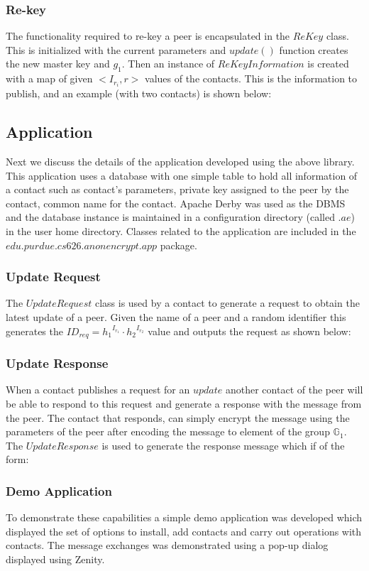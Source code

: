 \subsubsection{Re-key}
The functionality required to re-key a peer is encapsulated in the $ReKey$ class. This is initialized with the current parameters and $update()$ function creates the new master key and $g_1$. Then an instance of $ReKeyInformation$ is created with a map of given $<I_{r_i}, r>$ values of the contacts. This is the information to publish, and an example (with two contacts) is shown below:



\subsection{Application}

Next we discuss the details of the application developed using the above library. This application uses a database with one simple table to hold all information of a contact such as contact's parameters, private key assigned to the peer by the contact, common name for the contact. Apache Derby \cite{derby} was used as the DBMS and the database instance is maintained in a configuration directory (called $.ae$) in the user home directory. Classes related to the application are included in the $edu.purdue.cs626.anonencrypt.app$ package.\\

\subsubsection{Update Request}
The $UpdateRequest$ class is used by a contact to generate a request to obtain the latest update of a peer. Given the name of a peer and a random identifier this generates the $ID_{req} = {h_1}^{I_{r_1}} \cdot {h_2}^{I_{r_2}}$ value and outputs the request as shown below:



\subsubsection{Update Response}
When a contact publishes a request for an $update$ another contact of the peer will be able to respond to this request and generate a response with the message from the peer. The contact that responds, can simply encrypt the message using the parameters of the peer after encoding the message to element of the group $\mathbb{G}_1$. The $UpdateResponse$ is used to generate the response message which if of the form:



\subsubsection{Demo Application}
To demonstrate these capabilities a simple demo application was developed which displayed the set of options to install, add contacts and carry out operations with contacts. The message exchanges was demonstrated using a pop-up dialog displayed using Zenity\cite{zenity}.

